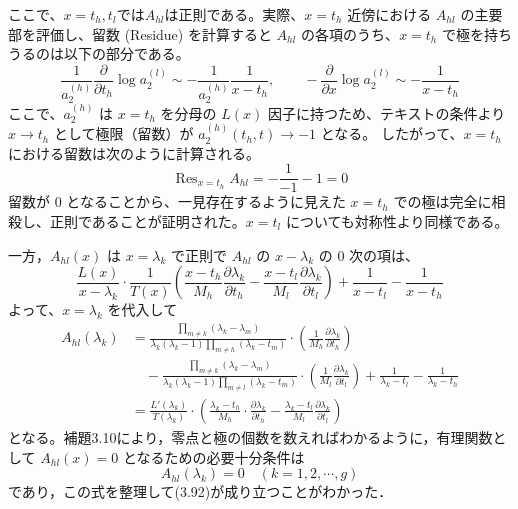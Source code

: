 \documentclass[paper=a4, fontsize=11pt]{jlreq} %
\newenvironment{story}{%
  \begin{mdframed}[
    backgroundcolor=red!5, %
    linewidth=0pt,         %
    innertopmargin=10pt,   %
    innerbottommargin=10pt,
    innerrightmargin=10pt, %
    innerleftmargin=10pt
  ]%
}{%
  \end{mdframed}%
}
\theoremstyle{break}
\theoremstyle{qa}
\begin{document}
ここで、$x=t_{h},t_{l}ではA_{hl}$は正則である。実際、$x=t_h$ 近傍における $A_{hl}$ の主要部を評価し、留数 (Residue) を計算すると
$A_{hl}$ の各項のうち、$x=t_h$ で極を持ちうるのは以下の部分である。
\begin{equation*}
    \frac{1}{a_2^{(h)}} \frac{\partial}{\partial t_h} \log a_2^{(l)} \sim - \frac{1}{a_2^{(h)}} \frac{1}{x-t_h}, \qquad - \frac{\partial}{\partial x} \log a_2^{(l)} \sim - \frac{1}{x-t_h}
\end{equation*}
ここで、$a_2^{(h)}$ は $x=t_h$ を分母の $L(x)$ 因子に持つため、テキストの条件より $x \to t_h$ として極限（留数）が $a_2^{(h)}(t_h, t) \to -1$ となる。
したがって、$x=t_h$ における留数は次のように計算される。
\begin{equation*}
    \mathop{\mathrm{Res}}_{x=t_h} A_{hl} = - \frac{1}{-1} - 1 = 0
\end{equation*}
留数が $0$ となることから、一見存在するように見えた $x=t_h$ での極は完全に相殺し、正則であることが証明された。$x=t_l$ についても対称性より同様である。

\begin{story}
一方，$A_{hl}(x)$ は $x=\lambda_k$ で正則で
$A_{hl}$ の $x-\lambda_k$ の $0$ 次の項は、
\begin{equation*}
    \frac{L(x)}{x-\lambda_k} \cdot \frac{1}{T(x)} \left( \frac{x-t_h}{M_h} \frac{\partial \lambda_k}{\partial t_h} - \frac{x-t_l}{M_l} \frac{\partial \lambda_k}{\partial t_l} \right) + \frac{1}{x-t_l} - \frac{1}{x-t_h}
\end{equation*}
よって、$x=\lambda_k$ を代入して
\begin{align*}
    A_{hl}(\lambda_k) &= \frac{\prod_{m \neq k} (\lambda_k - \lambda_m)}{\lambda_k(\lambda_k-1)\prod_{m \neq h} (\lambda_k - t_m)} \cdot \left( \frac{1}{M_h} \frac{\partial \lambda_k}{\partial t_h} \right) \\
    &\quad - \frac{\prod_{m \neq k} (\lambda_k - \lambda_m)}{\lambda_k(\lambda_k-1)\prod_{m \neq l} (\lambda_k - t_m)} \cdot \left( \frac{1}{M_l} \frac{\partial \lambda_k}{\partial t_l} \right) + \frac{1}{\lambda_k - t_l} - \frac{1}{\lambda_k - t_h} \\[8pt]
    &= \frac{L'(\lambda_k)}{T(\lambda_k)} \cdot \left( \frac{\lambda_k-t_h}{M_h} \cdot \frac{\partial \lambda_k}{\partial t_h} - \frac{\lambda_k-t_l}{M_l} \frac{\partial \lambda_k}{\partial t_l} \right)
\end{align*}
となる。補題3.10により，零点と極の個数を数えればわかるように，有理関数として $A_{hl}(x) = 0$ となるための必要十分条件は
\begin{equation*}
    A_{hl}(\lambda_k) = 0 \quad (k = 1, 2, \cdots, g)
\end{equation*}
であり，この式を整理して(3.92)が成り立つことがわかった．
\end{story}
\end{document}
